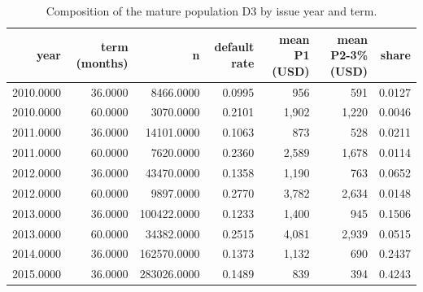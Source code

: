 \begin{table}[t]
\centering
\caption{Composition of the mature population D3 by issue year and term.}
\label{tab:T1b_d3_vintage_term}
\small
\begin{tabular}{rrrrrrr}
\toprule
year & term (months) & n & default rate & mean P1 (USD) & mean P2-3\% (USD) & share \\
\midrule
2010.0000 & 36.0000 & 8466.0000 & 0.0995 & 956 & 591 & 0.0127 \\
2010.0000 & 60.0000 & 3070.0000 & 0.2101 & 1,902 & 1,220 & 0.0046 \\
2011.0000 & 36.0000 & 14101.0000 & 0.1063 & 873 & 528 & 0.0211 \\
2011.0000 & 60.0000 & 7620.0000 & 0.2360 & 2,589 & 1,678 & 0.0114 \\
2012.0000 & 36.0000 & 43470.0000 & 0.1358 & 1,190 & 763 & 0.0652 \\
2012.0000 & 60.0000 & 9897.0000 & 0.2770 & 3,782 & 2,634 & 0.0148 \\
2013.0000 & 36.0000 & 100422.0000 & 0.1233 & 1,400 & 945 & 0.1506 \\
2013.0000 & 60.0000 & 34382.0000 & 0.2515 & 4,081 & 2,939 & 0.0515 \\
2014.0000 & 36.0000 & 162570.0000 & 0.1373 & 1,132 & 690 & 0.2437 \\
2015.0000 & 36.0000 & 283026.0000 & 0.1489 & 839 & 394 & 0.4243 \\
\bottomrule
\end{tabular}
\end{table}
